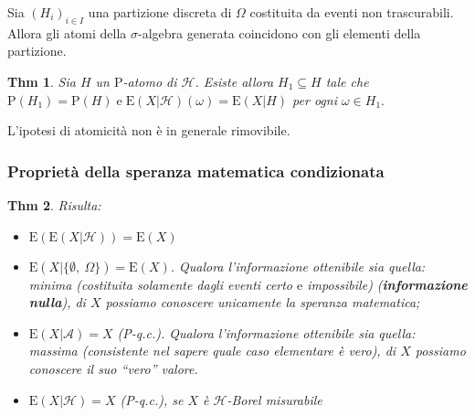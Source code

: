 \documentclass[a4paper,11pt]{article}
\theoremstyle{plain}
\newtheorem{thm}{Thm}[section]
\theoremstyle{definition}
\theoremstyle{remark}
\begin{document}
\noindent
Sia $(H_{i})_{i\in I}$ una partizione discreta di $\Omega$ costituita da eventi non trascurabili. Allora gli atomi della $\sigma$-algebra generata coincidono con gli elementi della partizione.

\begin{thm}
Sia $H$ un $\mathrm{P}$-atomo di $\mathcal{H}$. Esiste allora $H_{1}\subseteq H$ tale che $\mathrm{P}(H_{1})= \mathrm{P}(H)\mathrm{ \;e \; }\mathrm{E}(X|\mathcal{H})(\omega)=\mathrm{E}(X|H)$ per ogni $\omega\in H_{1}.$
\end{thm}

\noindent
L'ipotesi di atomicità non è in generale rimovibile.
\subsubsection{Proprietà della speranza matematica condizionata}
\begin{thm} Risulta:
\begin{itemize}
    \item $ \mathrm{E}(\mathrm{E}(X|\mathcal{H}))=\mathrm{E}(X)$
    \item $ \mathrm{E}(X|\{\emptyset,\ \Omega\})=\mathrm{E}(X)$. Qualora l'informazione ottenibile sia quella: minima (costituita solamente dagli eventi certo $\mathrm{e}$ impossibile) (\textbf{informazione nulla}), di $X$ possiamo conoscere unicamente la speranza matematica;
    \item $\mathrm{E}(X|\mathcal{A})=X$ (P-q.c.). Qualora l'informazione ottenibile sia quella: massima (consistente nel sapere quale caso elementare è vero), di $X$ possiamo conoscere il suo ``vero'' valore. 
    \item $ \mathrm{E}(X|\mathcal{H})=X$ (P-q.c.), se $X$ è $\mathcal{H}$-Borel misurabile
\end{itemize}
\end{thm}
\end{document}
